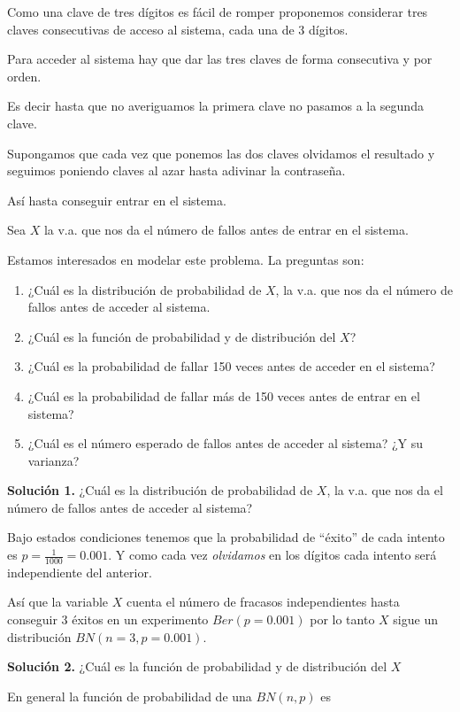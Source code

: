 \documentclass[
  letterpaper,
  DIV=11,
  numbers=noendperiod]{scrreprt}
\providecommand{\tightlist}{%
  \setlength{\itemsep}{0pt}\setlength{\parskip}{0pt}}\usepackage{longtable,booktabs,array}
\begin{document}
Como una clave de tres dígitos es fácil de romper proponemos considerar
tres claves consecutivas de acceso al sistema, cada una de 3 dígitos.

Para acceder al sistema hay que dar las tres claves de forma consecutiva
y por orden.

Es decir hasta que no averiguamos la primera clave no pasamos a la
segunda clave.

Supongamos que cada vez que ponemos las dos claves olvidamos el
resultado y seguimos poniendo claves al azar hasta adivinar la
contraseña.

Así hasta conseguir entrar en el sistema.

Sea \(X\) la v.a. que nos da el número de fallos antes de entrar en el
sistema.

Estamos interesados en modelar este problema. La preguntas son:

\begin{enumerate}
\def\labelenumi{\arabic{enumi}.}
\tightlist
\item
  ¿Cuál es la distribución de probabilidad de \(X\), la v.a. que nos da
  el número de fallos antes de acceder al sistema.
\item
  ¿Cuál es la función de probabilidad y de distribución del \(X\)?
\item
  ¿Cuál es la probabilidad de fallar 150 veces antes de acceder en el
  sistema?
\item
  ¿Cuál es la probabilidad de fallar más de 150 veces antes de entrar en
  el sistema?
\item
  ¿Cuál es el número esperado de fallos antes de acceder al sistema? ¿Y
  su varianza?
\end{enumerate}

\textbf{Solución 1.} ¿Cuál es la distribución de probabilidad de \(X\),
la v.a. que nos da el número de fallos antes de acceder al sistema?

Bajo estados condiciones tenemos que la probabilidad de ``éxito'' de
cada intento es \(p=\frac{1}{1000}=0.001\). Y como cada vez
\emph{olvidamos} en los dígitos cada intento será independiente del
anterior.

Así que la variable \(X\) cuenta el número de fracasos independientes
hasta conseguir 3 éxitos en un experimento \(Ber(p=0.001)\) por lo tanto
\(X\) sigue un distribución \(BN(n=3,p=0.001).\)

\textbf{Solución 2.} ¿Cuál es la función de probabilidad y de
distribución del \(X\)

En general la función de probabilidad de una \(BN(n,p)\) es
\end{document}
